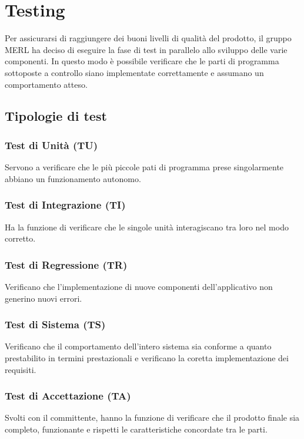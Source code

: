 \chapter{Testing}
Per assicurarsi di raggiungere dei buoni livelli di qualità del prodotto, il gruppo MERL ha deciso di eseguire la fase di test in parallelo allo sviluppo delle varie componenti. In questo modo è possibile verificare che le parti di programma sottoposte a controllo siano implementate correttamente e assumano un comportamento atteso.
\section{Tipologie di test}
    \subsection{Test di Unità (TU)}  Servono a verificare che le più piccole pati di programma prese singolarmente abbiano un funzionamento autonomo.
    \subsection{Test di Integrazione (TI)} Ha la funzione di verificare che le singole unità interagiscano tra loro nel modo corretto.
    \subsection{Test di Regressione (TR)} Verificano che l'implementazione di nuove componenti dell'applicativo non generino nuovi errori.
    \subsection{Test di Sistema (TS)} Verificano che il comportamento dell'intero sistema sia conforme a quanto prestabilito in termini prestazionali e verificano la coretta implementazione dei requisiti.
    \subsection{Test di Accettazione (TA)} Svolti con il committente, hanno la funzione di verificare che il prodotto
        finale sia completo, funzionante e rispetti le caratteristiche concordate tra le parti.


